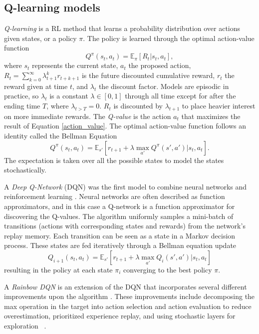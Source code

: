 \documentclass{article}
\begin{document}
\subsection{Q-learning models}

\emph{Q-learning} is a RL method that learns a probability distribution over actions given states, or a policy $\pi$.
The policy is learned through the optimal action-value function
\begin{equation}
\label{action_value}
Q^\pi (s_t, a_t) = \mathbb{E}_{\pi}[R_t| s_t, a_t ], 
\end{equation}
where $s_t$ represents the current state, $a_t$ the proposed action, $R_t = \sum_{k=0}^\infty \lambda_{t+1}^k r_{t+k+1}$ is the future discounted cumulative reward,  $r_t$ the reward given at time $t$, and $\lambda_t$ the discount factor.
Models are episodic in practice, so $\lambda_t$ is a constant $\lambda\in [0, 1]$ through all time except for after the ending time $T$, where $\lambda_{t>T}=0$.
$R_t$ is discounted  by $\lambda_{t+1}$ to place heavier interest on more immediate rewards.
The \emph{Q-value} is the action $a_t$ that maximizes the result of Equation \ref{action_value}.
The optimal action-value function follows an identity called the Bellman Equation
\begin{equation}
\label{bellman}
Q^\pi (s_t, a_t) = \mathbb{E}_{s'} [r_{t+1} + \lambda \max_{a'} Q^\pi (s',a')|s_t, a_t].
\end{equation}
The expectation is taken over all the possible states to model the states stochastically.

A \emph{Deep Q-Network} (DQN) was the first model to combine neural networks and reinforcement learning \cite{mnih:human-level}.
Neural networks are often described as function approximators, and in this case a Q-network is a function approximator for discovering the Q-values.
The algorithm uniformly samples a mini-batch of transitions (actions with corresponding states and rewards) from the network's replay memory.
Each transition can be seen as a state in a Markov decision process.
These states are fed iteratively through a Bellman equation update
\begin{equation}
\label{bellman_update}
Q_{i+1} (s_t, a_t) = \mathbb{E}_{s'} [r_{t+1} + \lambda \max_{a'} Q_i (s',a')|s_t, a_t]
\end{equation}
resulting in the policy at each state $\pi_i$ converging to the best policy $\pi$.

A \emph{Rainbow DQN} is an extension of the DQN that incorporates several different improvements upon the algorithm \cite{hessel-rainbow}.
These improvements include decomposing the max operation in the target into action selection and action evaluation to reduce overestimation, prioritized experience replay, and using stochastic layers for exploration ~\cite{van-hasselt:double,schaul:prioritized,fortunato:noisy}.
\end{document}
